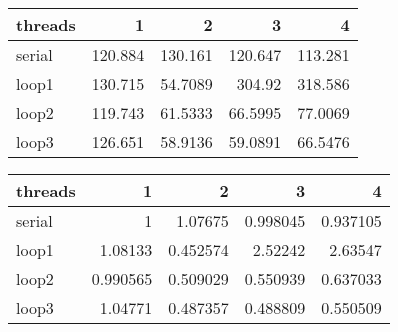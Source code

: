 \begin{tabular}{lrrrr}
\hline
 threads   &       1 &        2 &        3 &        4 \\
\hline
 serial    & 120.884 & 130.161  & 120.647  & 113.281  \\
 loop1     & 130.715 &  54.7089 & 304.92   & 318.586  \\
 loop2     & 119.743 &  61.5333 &  66.5995 &  77.0069 \\
 loop3     & 126.651 &  58.9136 &  59.0891 &  66.5476 \\
\hline
\end{tabular}
\begin{tabular}{lrrrr}
\hline
 threads   &        1 &        2 &        3 &        4 \\
\hline
 serial    & 1        & 1.07675  & 0.998045 & 0.937105 \\
 loop1     & 1.08133  & 0.452574 & 2.52242  & 2.63547  \\
 loop2     & 0.990565 & 0.509029 & 0.550939 & 0.637033 \\
 loop3     & 1.04771  & 0.487357 & 0.488809 & 0.550509 \\
\hline
\end{tabular}
